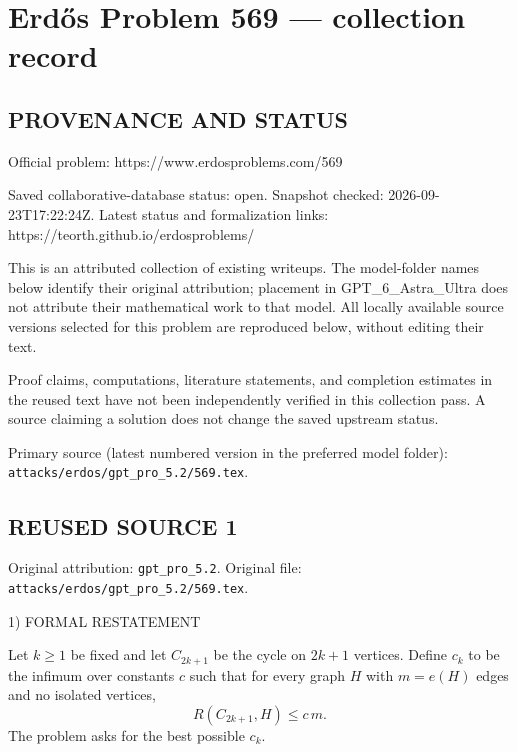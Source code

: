\section*{Erd\H{o}s Problem 569 --- collection record}

\subsection*{PROVENANCE AND STATUS}
Official problem: https://www.erdosproblems.com/569

Saved collaborative-database status: open.
Snapshot checked: 2026-09-23T17:22:24Z.
Latest status and formalization links: https://teorth.github.io/erdosproblems/

This is an attributed collection of existing writeups. The model-folder names below identify their original attribution; placement in GPT\_6\_Astra\_Ultra does not attribute their mathematical work to that model. All locally available source versions selected for this problem are reproduced below, without editing their text.

Proof claims, computations, literature statements, and completion estimates in the reused text have not been independently verified in this collection pass. A source claiming a solution does not change the saved upstream status.

Primary source (latest numbered version in the preferred model folder): \texttt{attacks/erdos/gpt\_pro\_5.2/569.tex}.

\subsection*{REUSED SOURCE 1}
Original attribution: \texttt{gpt\_pro\_5.2}.
Original file: \texttt{attacks/erdos/gpt\_pro\_5.2/569.tex}.


1) FORMAL RESTATEMENT

Let $k\ge 1$ be fixed and let $C_{2k+1}$ be the cycle on $2k+1$ vertices. Define $c_k$ to be the infimum over constants $c$ such that for every graph $H$ with $m=e(H)$ edges and no isolated vertices,
\[
R(C_{2k+1},H) \le c\,m.
\]
The problem asks for the best possible $c_k$.

